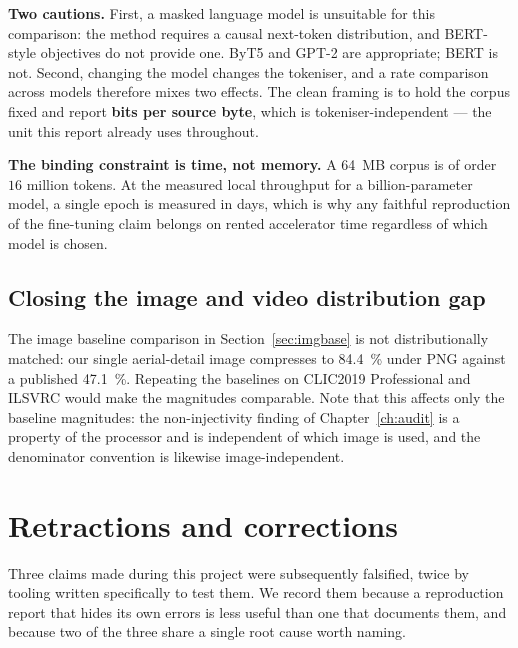 \documentclass[11pt,a4paper]{article}
\begin{document}
\textbf{Two cautions.} First, a masked language model is unsuitable for this
comparison: the method requires a causal next-token distribution, and BERT-style
objectives do not provide one. ByT5 and GPT-2 are appropriate; BERT is not.
Second, changing the model changes the tokeniser, and a rate comparison across
models therefore mixes two effects. The clean framing is to hold the corpus fixed
and report \textbf{bits per source byte}, which is tokeniser-independent --- the
unit this report already uses throughout.

\textbf{The binding constraint is time, not memory.} A \SI{64}{MB} corpus is of
order $16$ million tokens. At the measured local throughput for a
billion-parameter model, a single epoch is measured in days, which is why any
faithful reproduction of the fine-tuning claim belongs on rented accelerator time
regardless of which model is chosen.

\subsection{Closing the image and video distribution gap}

The image baseline comparison in Section~\ref{sec:imgbase} is not
distributionally matched: our single aerial-detail image compresses to
\SI{84.4}{\%} under PNG against a published \SI{47.1}{\%}. Repeating
the baselines on CLIC2019 Professional and ILSVRC would make the magnitudes
comparable. Note that this affects only the baseline magnitudes: the
non-injectivity finding of Chapter~\ref{ch:audit} is a property of the processor
and is independent of which image is used, and the denominator convention is
likewise image-independent.

\section{Retractions and corrections}
\label{ch:retractions}

Three claims made during this project were subsequently falsified, twice by
tooling written specifically to test them. We record them because a reproduction
report that hides its own errors is less useful than one that documents them, and
because two of the three share a single root cause worth naming.
\end{document}
